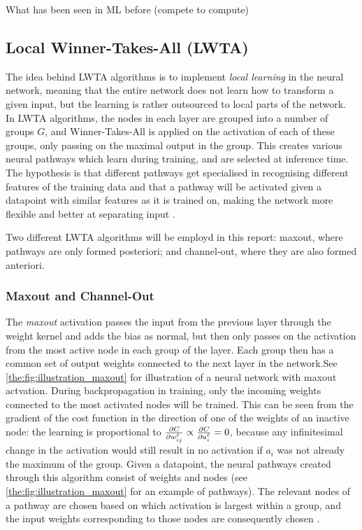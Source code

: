         What has been seen in ML before (compete to compute)

        

\subsection{Local Winner-Takes-All (LWTA)}
    The idea behind LWTA algorithms is to implement \textit{local learning} in the neural network, meaning that the entire network does not learn how to transform a given input, but the learning is rather outsourced to local parts of the network. In LWTA algorithms, the nodes in each layer are grouped into a number of groups $G$, and Winner-Takes-All is applied on the activation of each of these groups, only passing on the maximal output in the group. This creates various neural pathways which learn during training, and are selected at inference time. The hypothesis is that different pathways get specialised in recognising different features of the training data and that a pathway will be activated given a datapoint with similar features as it is trained on, making the network more flexible and better at separating input \citep{Wang}. 

    Two different LWTA algorithms will be employd in this report: maxout, where pathways are only formed posteriori; and channel-out, where they are also formed anteriori.

    \subsubsection{Maxout and Channel-Out}
        The \textit{maxout} activation passes the input from the previous layer through the weight kernel and adds the bias as normal, but then only passes on the activation from the most active node in each group of the layer. Each group then has a common set of output weights connected to the next layer in  the network.See \cref{the:fig:illustration_maxout} for illustration of a neural network with maxout actvation.
        During backpropagation in training, only the incoming weights connected to the most activated nodes will be trained. This can be seen from the gradient of the cost function in the direction of one of the weights of an inactive node: the learning is proportional to $\pd[w^{\ell}_{ij}]{C} \propto \pd[a^\ell_i]{C} = 0$, because any infinitesimal change in the activation would still result in no activation if $a_i$ was not already the maximum of the group. 
        Given a datapoint, the neural pathways created through this algorithm consist of weights and nodes (see \cref{the:fig:illustration_maxout} for an example of pathways). The relevant nodes of a pathway are chosen based on which activation is largest within a group, and the input weights corresponding to those nodes are consequently chosen \citep{Wang}. 
        

